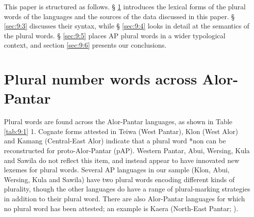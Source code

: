This paper is structured as follows. {\S} \ref{sec:9:2} introduces the lexical forms of the plural words of the languages and the sources of the data discussed in this paper. {\S} \ref{sec:9:3} discusses their syntax, while {\S} \ref{sec:9:4} looks in detail at the semantics of the plural words. {\S} \ref{sec:9:5} places AP plural words in a wider typological context, and section \ref{sec:9:6} presents our conclusions.

\section{Plural number words across Alor-Pantar}  %
\label{sec:9:2}
Plural words are found across the Alor-Pantar languages, as shown in Table \ref{tab:9:1} 1. Cognate forms attested in Teiwa (West Pantar), Klon (West Alor) and Kamang (Central-East Alor) indicate that a plural word *non can be reconstructed for proto-Alor-Pantar (pAP). Western Pantar, Abui, Wersing, Kula and Sawila do not reflect this item, and instead appear to have innovated new lexemes for plural words. Several AP languages in our sample (Klon, Abui, Wersing, Kula and Sawila) have two plural words encoding different kinds of plurality, though the other languages do have a range of plural-marking strategies in addition to their plural word. There are also Alor-Pantar languages for which no plural word has been attested; an example is Kaera (North-East Pantar; \citealt{Klamertakaera}).



